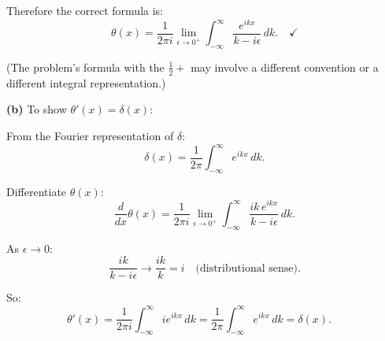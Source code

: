 \documentclass[12pt]{article}
\begin{document}
Therefore the correct formula is:
\[
\theta(x) = \frac{1}{2\pi i}\lim_{\epsilon\to 0^+}\int_{-\infty}^{\infty}\frac{e^{ikx}}{k-i\epsilon}\,dk. \quad \checkmark
\]

(The problem's formula with the $\frac{1}{2}+$ may involve a different convention or a different integral representation.)

\textbf{(b)} To show $\theta'(x) = \delta(x)$:

From the Fourier representation of $\delta$:
\[
\delta(x) = \frac{1}{2\pi}\int_{-\infty}^{\infty}e^{ikx}\,dk.
\]

Differentiate $\theta(x)$:
\[
\frac{d}{dx}\theta(x) = \frac{1}{2\pi i}\lim_{\epsilon\to 0^+}\int_{-\infty}^{\infty}\frac{ik\,e^{ikx}}{k-i\epsilon}\,dk.
\]

As $\epsilon \to 0$:
\[
\frac{ik}{k-i\epsilon} \to \frac{ik}{k} = i \quad \text{(distributional sense)}.
\]

So:
\[
\theta'(x) = \frac{1}{2\pi i}\int_{-\infty}^{\infty}ie^{ikx}\,dk = \frac{1}{2\pi}\int_{-\infty}^{\infty}e^{ikx}\,dk = \delta(x). \quad
\]
\end{document}
